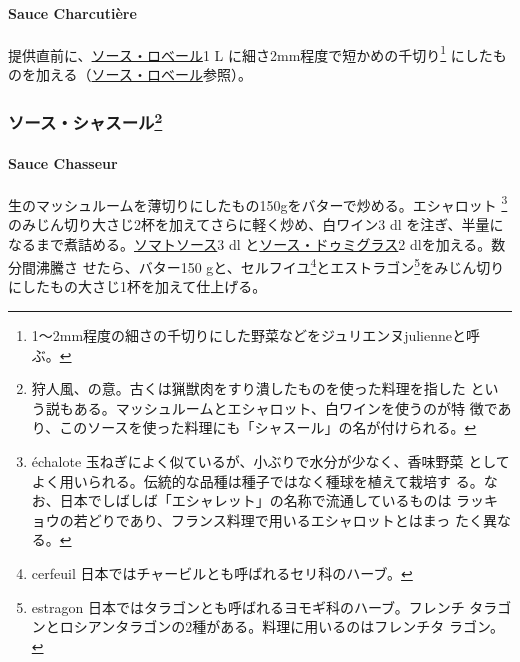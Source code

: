 \hypertarget{sauce-charcutiere}{%
\paragraph{Sauce Charcutière}\label{sauce-charcutiere}}

 

提供直前に、\href{}{ソース・ロベール}1 L
に細さ2mm程度で短かめの千切り\footnote{1〜2mm程度の細さの千切りにした野菜などをジュリエンヌjulienneと呼
  ぶ。} にしたものを加える（\href{}{ソース・ロベール}参照）。

\maeaki

\hypertarget{ux30bdux30fcux30b9ux30b7ux30e3ux30b9ux30fcux30eb10}{%
\subsubsection[ソース・シャスール]{\texorpdfstring{ソース・シャスール\footnote{狩人風、の意。古くは猟獣肉をすり潰したものを使った料理を指した
  という説もある。マッシュルームとエシャロット、白ワインを使うのが特
  徴であり、このソースを使った料理にも「シャスール」の名が付けられる。}}{ソース・シャスール}}\label{ux30bdux30fcux30b9ux30b7ux30e3ux30b9ux30fcux30eb10}}

\hypertarget{sauce-chasseur}{%
\paragraph{Sauce Chasseur}\label{sauce-chasseur}}

  

生のマッシュルームを薄切りにしたもの150gをバターで炒める。エシャロット
\footnote{échalote
  玉ねぎによく似ているが、小ぶりで水分が少なく、香味野菜
  としてよく用いられる。伝統的な品種は種子ではなく種球を植えて栽培す
  る。なお、日本でしばしば「エシャレット」の名称で流通しているものは
  ラッキョウの若どりであり、フランス料理で用いるエシャロットとはまっ
  たく異なる。}のみじん切り大さじ2\undemi{}杯を加えてさらに軽く炒め、白ワイン3
dl
を注ぎ、半量になるまで煮詰める。\protect\hyperlink{sauce-tomate}{ソマトソース}3
dl と\protect\hyperlink{sauce-demi-glace}{ソース・ドゥミグラス}2
dlを加える。数分間沸騰さ せたら、バター150 gと、セルフイユ\footnote{cerfeuil
  日本ではチャービルとも呼ばれるセリ科のハーブ。}とエストラゴン\footnote{estragon
  日本ではタラゴンとも呼ばれるヨモギ科のハーブ。フレンチ
  タラゴンとロシアンタラゴンの2種がある。料理に用いるのはフレンチタ
  ラゴン。}をみじん切り にしたもの大さじ1\undemi{}杯を加えて仕上げる。

